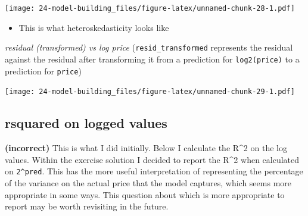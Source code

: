 \documentclass[]{book}
\newenvironment{Shaded}{\begin{snugshade}}{\end{snugshade}}
\newcommand{\CommentTok}[1]{\textcolor[rgb]{0.56,0.35,0.01}{\textit{#1}}}
\newcommand{\DataTypeTok}[1]{\textcolor[rgb]{0.13,0.29,0.53}{#1}}
\newcommand{\DecValTok}[1]{\textcolor[rgb]{0.00,0.00,0.81}{#1}}
\newcommand{\KeywordTok}[1]{\textcolor[rgb]{0.13,0.29,0.53}{\textbf{#1}}}
\newcommand{\NormalTok}[1]{#1}
\newcommand{\OperatorTok}[1]{\textcolor[rgb]{0.81,0.36,0.00}{\textbf{#1}}}
\newcommand{\StringTok}[1]{\textcolor[rgb]{0.31,0.60,0.02}{#1}}
\providecommand{\tightlist}{%
  \setlength{\itemsep}{0pt}\setlength{\parskip}{0pt}}
\theoremstyle{definition}
\theoremstyle{definition}
\theoremstyle{definition}
\theoremstyle{remark}
\begin{document}
\texttt{[image: 24-model-building\_files/figure-latex/unnamed-chunk-28-1.pdf]}

\begin{itemize}
\tightlist
\item
  This is what heteroskedasticity looks like
\end{itemize}

\emph{residual (transformed) vs log price} (\texttt{resid\_transformed}
represents the residual against the residual after transforming it from
a prediction for \texttt{log2(price)} to a prediction for
\texttt{price})

\begin{Shaded}
\end{Shaded}

\texttt{[image: 24-model-building\_files/figure-latex/unnamed-chunk-29-1.pdf]}

\hypertarget{rsquared-on-logged-values}{%
\subsection{rsquared on logged values}\label{rsquared-on-logged-values}}

\textbf{(incorrect)} This is what I did initially. Below I calculate the
R\^{}2 on the log values. Within the exercise solution I decided to
report the R\^{}2 when calculated on \texttt{2\^{}pred}. This has the
more useful interpretation of representing the percentage of the
variance on the actual price that the model captures, which seems more
appropriate in some ways. This question about which is more appropriate
to report may be worth revisiting in the future.
\end{document}
